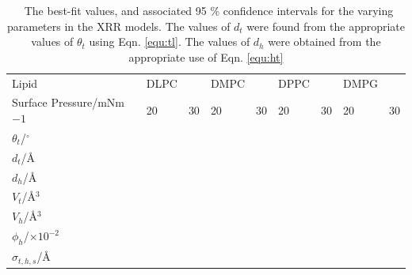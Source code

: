 \documentclass[twoside,twocolumn,9pt]{article}
\begin{document}
\begin{table}
	\small
	\caption{\ The best-fit values, and associated 95 \% confidence intervals for the varying parameters in the XRR models. The values of $d_t$ were found from the appropriate values of $\theta_t$ using Eqn. \ref{equ:tl}. The values of $d_h$ were obtained from the appropriate use of Eqn. \ref{equ:ht}}
	\label{tab:liptab}
	\begin{tabular*}{\textwidth}{@{\extracolsep{\fill}}lllllllll}
		\hline
		Lipid & DLPC & & DMPC & & DPPC & & DMPG & \\
		Surface Pressure/mNm${-1}$ & 20 & 30 & 20 & 30 & 20 & 30 & 20 & 30 \\
		\hline
		$\theta_t$/$^\circ$ &  &  &  &  &  &  &  &  \\
		$d_t$/\AA &  &  &  &  &  &  &  &  \\
		$d_h$/\AA &  &  &  &  &  &  &  &  \\
		$V_t$/\AA$^3$ &  &  &  &  &  &  &  &  \\
		$V_h$/\AA$^3$ &  &  &  &  &  &  &  &  \\
		$\phi_h$/$\times10^{-2}$ &  &  &  &  &  &  &  &  \\
		$\sigma_{t,h,s}$/\AA &  &  &  &  &  &  &  &  \\
		\hline
	\end{tabular*}
\end{table}
\end{document}
